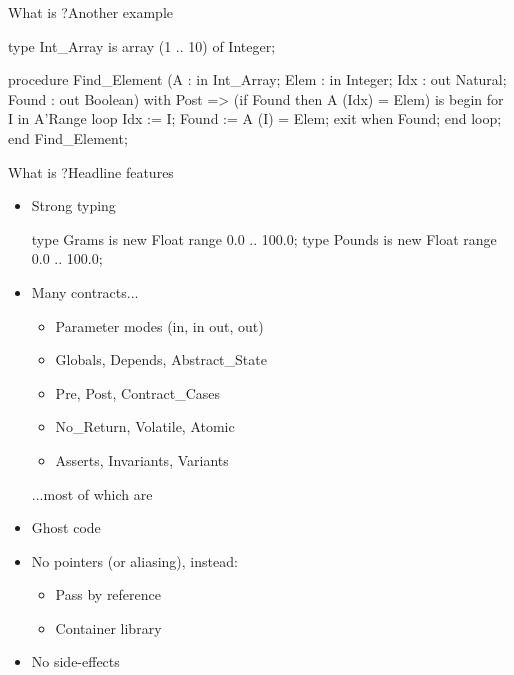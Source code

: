 \documentclass{beamer}
\begin{document}
\begin{frame}[fragile]{What is \spark?}{Another example}
  \begin{pxcode}[language=SPARK,gobble=4]
    type Int_Array is array (1 .. 10) of Integer;

    procedure Find_Element (A     : in     Int_Array;
                            Elem  : in     Integer;
                            Idx   :    out Natural;
                            Found :    out Boolean)
    with
       Post => (if Found then A (Idx) = Elem)
    is
    begin
       for I in A'Range loop
          Idx   := I;
          Found := A (I) = Elem;
          exit when Found;
       end loop;
    end Find_Element;
  \end{pxcode}
\end{frame}

\begin{frame}[fragile]{What is \spark?}{Headline features}
  \begin{itemize}
  \item Strong typing
    \begin{pxcode}[language=SPARK,gobble=6]
      type Grams  is new Float range 0.0 .. 100.0;
      type Pounds is new Float range 0.0 .. 100.0;
    \end{pxcode}

  \item Many contracts...
    \begin{itemize}
    \item Parameter modes (in, in out, out)
    \item Globals, Depends, Abstract\_State
    \item Pre, Post, Contract\_Cases
    \item No\_Return, Volatile, Atomic
    \item Asserts, Invariants, Variants
    \end{itemize}
    ...most of which are 

  \item Ghost code

  \item No pointers (or aliasing), instead:
    \begin{itemize}
    \item Pass by reference
    \item Container library
    \end{itemize}
  \item No side-effects
  \end{itemize}
\end{frame}
\end{document}
